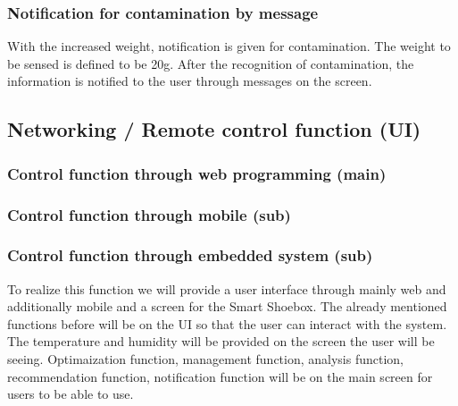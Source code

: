 \documentclass[conference]{IEEEtran}
\begin{document}
\subsubsection{Notification for contamination by message}
With the increased weight, notification is given for contamination. The weight to be sensed is defined to be 20g.
After the recognition of contamination, the information is notified to the user through messages on the screen.


\subsection{Networking / Remote control function (UI)}
\subsubsection{Control function through web programming (main)}
\subsubsection{Control function through mobile (sub)}
\subsubsection{Control function through embedded system (sub)}
To realize this function we will provide a user interface through mainly web and additionally mobile and a screen for the Smart Shoebox. The already mentioned functions before will be on the UI so that the user can interact with the system. The temperature and humidity will be provided on the screen the user will be seeing. Optimaization function, management function, analysis function, recommendation function, notification function will be on the main screen for users to be able to use. 
\end{document}
